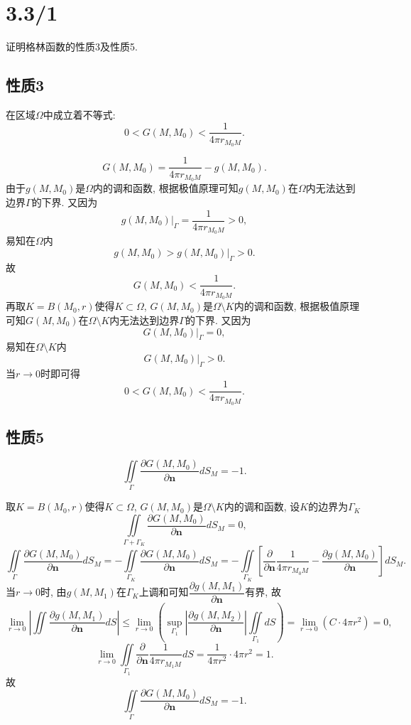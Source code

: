 \documentclass[11pt,a4paper]{article}
\author{刘逸灏 (515370910207)}
\begin{document}
\maketitle
\section{3.3/1}
\begin{problem}
证明格林函数的性质3及性质5.
\end{problem}

\subsection*{性质3}
\begin{problem}
在区域$\Omega$中成立着不等式:
$$0<G(M,M_0)<\frac{1}{4\pi r_{M_0M}}.$$
\end{problem}

$$G(M,M_0)=\frac{1}{4\pi r_{M_0M}}-g(M,M_0).$$
由于$g(M,M_0)$是$\Omega$内的调和函数, 根据极值原理可知$g(M,M_0)$在$\Omega$内无法达到边界$\Gamma$的下界. 又因为
$$g(M,M_0)|_\Gamma=\frac{1}{4\pi r_{M_0M}}>0,$$
易知在$\Omega$内$$g(M,M_0)>g(M,M_0)|_\Gamma>0.$$
故$$G(M,M_0)<\frac{1}{4\pi r_{M_0M}}.$$
再取$K=B(M_0,r)$使得$K\subset\Omega$, $G(M,M_0)$是$\Omega\setminus K$内的调和函数, 根据极值原理可知$G(M,M_0)$在$\Omega\setminus K$内无法达到边界$\Gamma$的下界. 又因为
$$G(M,M_0)|_\Gamma=0,$$
易知在$\Omega\setminus K$内$$G(M,M_0)|_\Gamma>0.$$
当$r\to0$时即可得
$$0<G(M,M_0)<\frac{1}{4\pi r_{M_0M}}.$$

\subsection*{性质5}
\begin{problem}
$$\iint\limits_{\Gamma}\frac{\partial G(M,M_0)}{\partial\mathbf{n}}dS_M=-1.$$
\end{problem}
取$K=B(M_0,r)$使得$K\subset\Omega$, $G(M,M_0)$是$\Omega\setminus K$内的调和函数, 设$K$的边界为$\Gamma_K$
$$\iint\limits_{\Gamma+\Gamma_K}\frac{\partial G(M,M_0)}{\partial\mathbf{n}}dS_M=0,$$
$$\iint\limits_{\Gamma}\frac{\partial G(M,M_0)}{\partial\mathbf{n}}dS_M=-\iint\limits_{\Gamma_K}\frac{\partial G(M,M_0)}{\partial\mathbf{n}}dS_M=-\iint\limits_{\Gamma_K}\left[\frac{\partial}{\partial\mathbf{n}}\frac{1}{4\pi r_{M_0M}}-\frac{\partial g(M,M_0)}{\partial\mathbf{n}}\right]dS_M.$$
当$r\to0$时, 由$g(M,M_1)$在$\Gamma_K$上调和可知$\dfrac{\partial g(M,M_1)}{\partial\mathbf{n}}$有界, 故
$$\lim_{r\to0}\left|\iint\frac{\partial g(M,M_1)}{\partial\mathbf{n}}dS\right|\leqslant \lim_{r\to 0}\left(\sup_{\Gamma_1}\left|\frac{\partial g(M,M_2)}{\partial\mathbf{n}}\right|\iint\limits_{\Gamma_1}dS\right)=\lim_{r\to0}(C\cdot 4\pi r^2)=0,$$
$$\lim_{r\to0}\iint\limits_{\Gamma_1}\frac{\partial}{\partial\mathbf{n}}\frac{1}{4\pi r_{M_1M}}dS=\frac{1}{4\pi r^2}\cdot 4\pi r^2=1.$$
故
$$\iint\limits_{\Gamma}\frac{\partial G(M,M_0)}{\partial\mathbf{n}}dS_M=-1.$$
\end{document}
